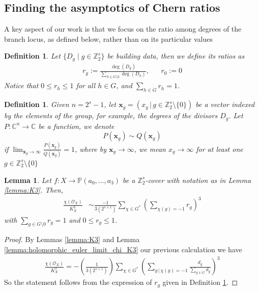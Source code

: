 \documentclass[12pt,twoside,]{amsart}
\theoremstyle{plain}
\newtheorem{lemma}[theorem]{Lemma}
\newtheorem{definition}[theorem]{Definition}
\theoremstyle{definition}
\begin{document}

\subsection{Finding the asymptotics of Chern ratios}\label{sec:ratios}
A key aspect of our work is that we focus on the ratio among degrees of the branch locus, as defined below, rather than on its particular values 
\begin{definition}\label{definition of ratios}
Let $\{ D_g \;| \; g \in \mathbb{Z}_2^s \}$ be building data, then we define its ratios as 
\begin{align*}
 r_g:= \frac{\deg(D_g)}{\sum_{h \in G\setminus 0} \deg(D_{h})},
 &&
 r_0 := 0
\end{align*}
 Notice that $0 \leq r_h \leq 1$ for all $h \in G$, and  $\sum_{h \in G} r_h =1$.
\end{definition}
\begin{definition}\label{def:limit}
Given $n=2^{s}-1$, let 
$\mathbf{x}_g = (x_g \, | \, g \in \mathbb{Z}^s_2 \setminus \{0\})$ be a vector indexed by the elements of the group, for example, the degrees of the divisors $D_g$.
Let $P:\mathbb{C}^n \to \mathbb{C}$ be a function, we denote 
\[
 P( \mathbf{x}_g)
 \sim Q( \mathbf{x}_g)
\] 
 if $\lim_{\mathbf{x}_g \rightarrow \infty} \displaystyle\frac{P( \mathbf{x}_g)}{Q( \mathbf{x}_g)} = 1$, where by ${\mathbf{x}_g \rightarrow \infty}$, we mean $x_g \rightarrow \infty$ for at least one $g \in \mathbb{Z}^s_2 \setminus \{0\}$
 \end{definition}

\begin{lemma}
\label{lemma:ratio_holomorphic_euler_limit_chi_K3}
Let $f:X \to \mathbb{P}(a_0, \ldots, a_3)$ be a $\mathbb{Z}^s_2$-cover with notation as in Lemma \ref{lemma:K3}. Then, 
 \begin{align*}
 \frac{\chi(\mathcal{O}_X)}{K_X^3}
  &\sim \frac{ -1}{3(2^{s+1})} 
 \sum_{\chi \in G^*} 
  \left( 
  \sum_{\chi(g) =-1}   
  r_g
  \right)^3 
 \end{align*}
 with $\sum_{g \in G \setminus 0}  r_g = 1$ and $0 \leq r_g \leq 1$.
\end{lemma}
\begin{proof}
 By Lemmas \ref{lemma:K3} and 
 Lemma \ref{lemma:holomorphic_euler_limit_chi_K3}
 our previous calculation we have
 \begin{align*}
     \frac{\chi(\mathcal{O}_X)}{K_X^3}
  =
-  \left( \frac{ 1}{3(2^{s+1})} \right)
 \sum_{\chi \in G^*} 
  \left( 
  \sum_{g \, | \, \chi(g) = -1 }   
  \frac{   d_g}
    {\sum_{g \in G} d_{g}}
  \right)^3 
 \end{align*}
 So the statement follows from the expression of $r_g$ given in Definition \ref{definition of ratios}.   
\end{proof}
\end{document}
